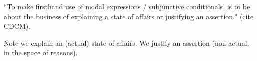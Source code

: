 ``To make firsthand use of modal expressions / subjunctive conditionals, is to
be about the business of explaining a state of affairs or justifying an
assertion." (cite CDCM).

Note we explain an (actual) state of affairs. We justify an assertion
(non-actual, in the space of reasons).

